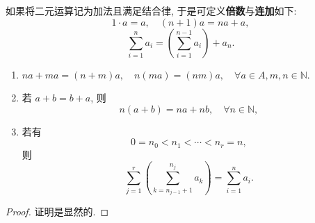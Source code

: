 \documentclass[../../main.tex]{subfiles}%
\begin{document}
\begin{definition}\label{definition:倍数的定义}
如果将二元运算记为加法且满足结合律, 于是可定义\textbf{倍数}与\textbf{连加}如下:
\[
1 \cdot a = a,\quad (n + 1)a = na + a,
\]
\[
\sum_{i = 1}^n a_i = \left( \sum_{i = 1}^{n - 1} a_i \right) + a_n.
\]
\end{definition}

\begin{proposition}\label{proposition:倍数和连加的性质}
\begin{enumerate}
\item $na + ma = (n + m)a,\quad n(ma) = (nm)a,\quad \forall a \in A, m,n \in \mathbb{N}.$

\item 若 \( a + b = b + a \), 则
\[
n(a + b) = na + nb,\quad \forall n \in \mathbb{N},
\]

\item 若有
\[
0 = n_0 < n_1 < \cdots < n_r = n,
\]
则
\[
\sum_{j = 1}^r \left( \sum_{k = n_{j - 1} + 1}^{n_j} a_k \right) = \sum_{i = 1}^n a_i.
\]
\end{enumerate}
\end{proposition}
\begin{proof}

证明是显然的.

\end{proof}
\end{document}
